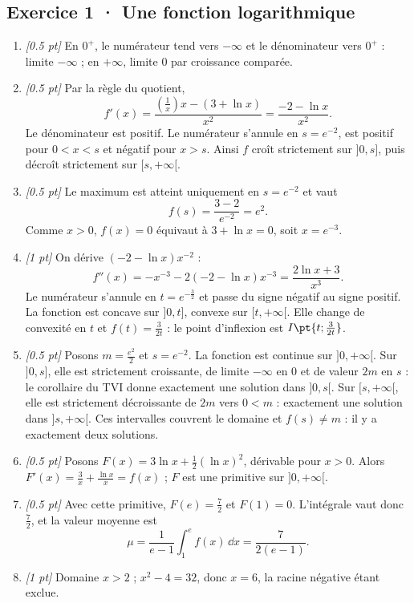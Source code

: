 \subsection*{Exercice 1 · Une fonction logarithmique}\begin{enumerate}

\item \textit{[\num{0,5} pt]} En $0^+$, le numérateur tend vers $-\infty$ et le dénominateur vers $0^+$ : limite $-\infty$ ; en $+\infty$, limite $0$ par croissance comparée.

\item \textit{[\num{0,5} pt]} Par la règle du quotient,
\[f'(x)=\frac{(\frac{1}{x})x-(3+\ln x)}{x^2}=\frac{-2-\ln x}{x^2}.\]
Le dénominateur est positif. Le numérateur s'annule en $s=e^{-2}$, est positif pour $0<x<s$ et négatif pour $x>s$. Ainsi $f$ croît strictement sur $]0,s]$, puis décroît strictement sur $[s,+\infty[$.

\item \textit{[\num{0,5} pt]} Le maximum est atteint uniquement en $s=e^{-2}$ et vaut
\[f(s)=\frac{3- 2}{e^{-2}}=e^{2}.\]
Comme $x>0$, $f(x)=0$ équivaut à $3+\ln x=0$, soit $x=e^{-3}$.

\item \textit{[1 pt]} On dérive $(-2-\ln x)x^{-2}$ :
\[f''(x)=-x^{-3}-2(-2-\ln x)x^{-3}=\frac{2\ln x+3}{x^3}.\]
Le numérateur s'annule en $t=e^{-\frac{3}{2}}$ et passe du signe négatif au signe positif. La fonction est concave sur $]0,t]$, convexe sur $[t,+\infty[$. Elle change de convexité en $t$ et $f(t)=\frac{3}{2t}$ : le point d'inflexion est $I\pt{t;\frac{3}{2t}}$.

\item \textit{[\num{0,5} pt]} Posons $m=\frac{e^{2}}{2}$ et $s=e^{-2}$. La fonction est continue sur $]0,+\infty[$. Sur $]0,s]$, elle est strictement croissante, de limite $-\infty$ en $0$ et de valeur $2m$ en $s$ : le corollaire du TVI donne exactement une solution dans $]0,s[$. Sur $[s,+\infty[$, elle est strictement décroissante de $2m$ vers $0<m$ : exactement une solution dans $]s,+\infty[$. Ces intervalles couvrent le domaine et $f(s)\ne m$ : il y a exactement deux solutions.

\item \textit{[\num{0,5} pt]} Posons $F(x)=3\ln x+\frac12(\ln x)^2$, dérivable pour $x>0$. Alors $F'(x)=\frac{3}{x}+\frac{\ln x}{x}=f(x)$ ; $F$ est une primitive sur $]0,+\infty[$.

\item \textit{[\num{0,5} pt]} Avec cette primitive, $F(e)=\frac{7}{2}$ et $F(1)=0$. L'intégrale vaut donc $\frac{7}{2}$, et la valeur moyenne est
\[\mu=\frac{1}{e-1}\int_1^e f(x)\,\dd x=\frac{7}{2(e-1)}.\]

\item \textit{[1 pt]} Domaine $x>2$ ; $x^2-4=32$, donc $x=6$, la racine négative étant exclue.

\end{enumerate}

